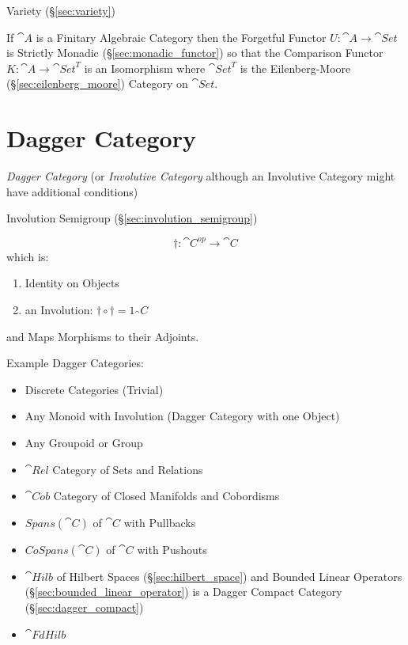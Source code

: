 Variety (\S\ref{sec:variety})

If $\cat{A}$ is a Finitary Algebraic Category then the Forgetful
Functor $U : \cat{A} \rightarrow \cat{Set}$ is Strictly Monadic
(\S\ref{sec:monadic_functor}) so that the Comparison Functor $K :
\cat{A} \rightarrow \cat{Set}^T$ is an Isomorphism where
$\cat{Set}^T$ is the Eilenberg-Moore (\S\ref{sec:eilenberg_moore})
Category on $\cat{Set}$.




\section{Dagger Category}\label{sec:dagger_category}

\emph{Dagger Category} (or \emph{Involutive Category} although an
Involutive Category might have additional conditions) %

Involution Semigroup (\S\ref{sec:involution_semigroup})

\[
  \dag : \cat{C}^{op} \rightarrow \cat{C}
\]
which is:
\begin{enumerate}
  \item Identity on Objects
  \item an Involution: $\dag \circ \dag = 1_\cat{C}$
\end{enumerate}
and Maps Morphisms to their Adjoints. %

Example Dagger Categories:
\begin{itemize}
  \item Discrete Categories (Trivial)
  \item Any Monoid with Involution (Dagger Category with one Object)
  \item Any Groupoid or Group
  \item $\cat{Rel}$ Category of Sets and Relations
  \item $\cat{Cob}$ Category of Closed Manifolds and Cobordisms
  \item $Spans(\cat{C})$ of $\cat{C}$ with Pullbacks
  \item $CoSpans(\cat{C})$ of $\cat{C}$ with Pushouts
  \item $\cat{Hilb}$ of Hilbert Spaces (\S\ref{sec:hilbert_space}) and
    Bounded Linear Operators (\S\ref{sec:bounded_linear_operator}) is
    a Dagger Compact Category (\S\ref{sec:dagger_compact})
  \item $\cat{FdHilb}$
\end{itemize}

